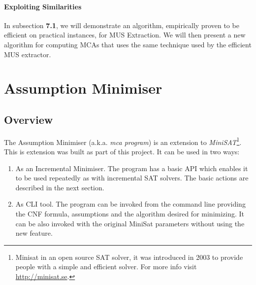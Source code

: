 \documentclass[]{article}
\begin{document}
	\paragraph{Exploiting Similarities} In subsection \textbf{7.1}, we will demonstrate an algorithm, empirically proven \cite{Rotation} to be efficient on practical instances, for MUS Extraction. We will then present a new algorithm for computing MCAs that uses the same technique used by the efficient MUS extractor.

	\pagebreak
	\section{Assumption Minimiser}
	\subsection{Overview}
		The Assumption Minimiser (a.k.a. \textit{mca program}) is an extension to \textit{MiniSAT}\footnote{Minisat in an open source SAT solver, it was introduced in 2003 to provide people with a simple and efficient solver. For more info visit \url{http://minisat.se}.}. This is extension was built as part of this project. It can be used in two ways:
		\begin{enumerate}
				\item As an Incremental Minimiser. The program has a basic API which enables it to be used repeatedly as with incremental SAT solvers. The basic actions are described in the next section.
				\item As CLI tool. The program can be invoked from the command line providing the CNF formula, assumptions and the algorithm desired for minimizing. It can be also invoked with the original MiniSat parameters without using the new feature.
		\end{enumerate}
	
\end{document}
